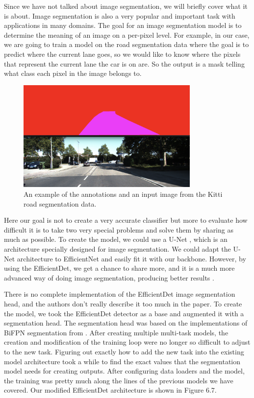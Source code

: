 Since we have not talked about image segmentation, we will briefly cover what it is about.
Image segmentation is also a very popular and important task with applications in many domains.
The goal for an image segmentation model is to determine the meaning of an image on a per-pixel level.
For example, in our case, we are going to train a model on the road segmentation data where the goal is to predict where the current lane goes, so we would like to know where the pixels that represent the current lane the car is on are.
So the output is a mask telling what class each pixel in the image belongs to.

\begin{figure}[h!] 
\centering 
\includegraphics[width=0.8\textwidth]{imgs/segmentation-example.png}
\caption{An example of the annotations and an input image from the Kitti \citep{kitti} road segmentation data.}
\end{figure}

Here our goal is not to create a very accurate classifier but more to evaluate how difficult it is to take two very special problems and solve them by sharing as much as possible.
To create the model, we could use a U-Net \citep{unet}, which is an architecture specially designed for image segmentation.
We could adapt the U-Net architecture to EfficientNet and easily fit it with our backbone.
However, by using the EfficientDet, we get a chance to share more, and it is a much more advanced way of doing image segmentation, producing better results \citep{efficientDet}.

There is no complete implementation of the EfficientDet image segmentation head, and the authors don't really describe it too much in the paper.
To create the model, we took the EfficientDet detector as a base and augmented it with a segmentation head.
The segmentation head was based on the implementations of BiFPN segmentation from \citep{segment_pytorch}.
After creating multiple multi-task models, the creation and modification of the training loop were no longer so difficult to adjust to the new task.
Figuring out exactly how to add the new task into the existing model architecture took a while to find the exact values that the segmentation model needs for creating outputs.
After configuring data loaders and the model, the training was pretty much along the lines of the previous models we have covered.
Our modified EfficientDet architecture is shown in Figure 6.7.


